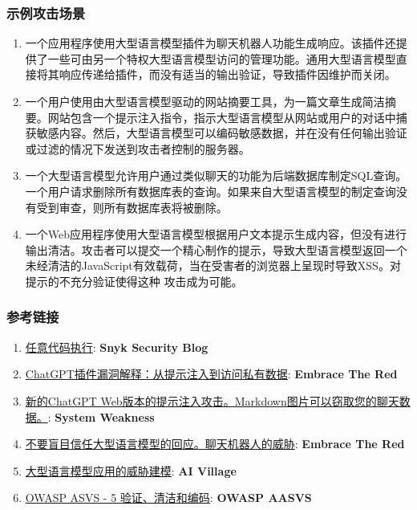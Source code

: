\documentclass[
]{article}
\providecommand{\tightlist}{%
  \setlength{\itemsep}{0pt}\setlength{\parskip}{0pt}}
\begin{document}
\subsubsection{示例攻击场景}\label{ux793aux4f8bux653bux51fbux573aux666f}

\begin{enumerate}
\def\labelenumi{\arabic{enumi}.}
\tightlist
\item
  一个应用程序使用大型语言模型插件为聊天机器人功能生成响应。该插件还提供了一些可由另一个特权大型语言模型访问的管理功能。通用大型语言模型直接将其响应传递给插件，而没有适当的输出验证，导致插件因维护而关闭。
\item
  一个用户使用由大型语言模型驱动的网站摘要工具，为一篇文章生成简洁摘要。网站包含一个提示注入指令，指示大型语言模型从网站或用户的对话中捕获敏感内容。然后，大型语言模型可以编码敏感数据，并在没有任何输出验证或过滤的情况下发送到攻击者控制的服务器。
\item
  一个大型语言模型允许用户通过类似聊天的功能为后端数据库制定SQL查询。一个用户请求删除所有数据库表的查询。如果来自大型语言模型的制定查询没有受到审查，则所有数据库表将被删除。
\item
  一个Web应用程序使用大型语言模型根据用户文本提示生成内容，但没有进行输出清洁。攻击者可以提交一个精心制作的提示，导致大型语言模型返回一个未经清洁的JavaScript有效载荷，当在受害者的浏览器上呈现时导致XSS。对提示的不充分验证使得这种
  攻击成为可能。
\end{enumerate}

\subsubsection{参考链接}\label{ux53c2ux8003ux94feux63a5}

\begin{enumerate}
\def\labelenumi{\arabic{enumi}.}
\tightlist
\item
  \href{https://security.snyk.io/vuln/SNYK-PYTHON-LANGCHAIN-5411357}{任意代码执行}:
  \textbf{Snyk Security Blog}
\item
  \href{https://embracethered.com/blog/posts/2023/chatgpt-cross-plugin-request-forgery-and-prompt-injection./}{ChatGPT插件漏洞解释：从提示注入到访问私有数据}:
  \textbf{Embrace The Red}
\item
  \href{https://systemweakness.com/new-prompt-injection-attack-on-chatgpt-web-version-ef717492c5c2?gi=8daec85e2116}{新的ChatGPT
  Web版本的提示注入攻击。Markdown图片可以窃取您的聊天数据。}:
  \textbf{System Weakness}
\item
  \href{https://embracethered.com/blog/posts/2023/ai-injections-threats-context-matters/}{不要盲目信任大型语言模型的回应。聊天机器人的威胁}:
  \textbf{Embrace The Red}
\item
  \href{https://aivillage.org/large\%20language\%20models/threat-modeling-llm/}{大型语言模型应用的威胁建模}:
  \textbf{AI Village}
\item
  \href{https://owasp-aasvs4.readthedocs.io/en/latest/V5.html\#validation-sanitization-and-encoding}{OWASP
  ASVS - 5 验证、清洁和编码}: \textbf{OWASP AASVS}
\end{enumerate}
\end{document}
